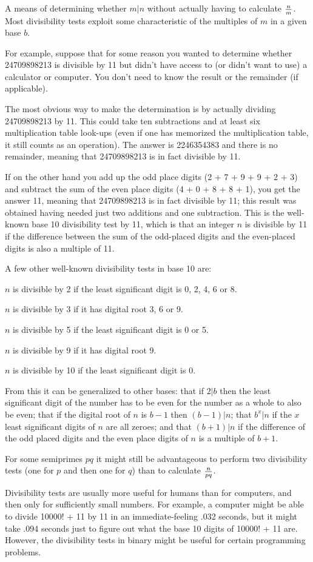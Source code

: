 \documentclass[12pt]{article}
\begin{document}
A means of determining whether $m|n$ without actually having to calculate $n \over m$. Most divisibility tests exploit some characteristic of the multiples of $m$ in a given base $b$.

For example, suppose that for some reason you wanted to determine whether 24709898213 is divisible by 11 but didn't have access to (or didn't want to use) a calculator or computer. You don't need to know the result or the remainder (if applicable).

The most obvious way to make the determination is by actually dividing 24709898213 by 11. This could take ten subtractions and at least six multiplication table look-ups (even if one has memorized the multiplication table, it still counts as an operation). The answer is 2246354383 and there is no remainder, meaning that 24709898213 is in fact divisible by 11.

If on the other hand you add up the odd place digits (2 + 7 + 9 + 9 + 2 + 3) and subtract the sum of the even place digits (4 + 0 + 8 + 8 + 1), you get the answer 11, meaning that 24709898213 is in fact divisible by 11; this result was obtained having needed just two additions and one subtraction. This is the well-known base 10 divisibility test by 11, which is that an integer $n$ is divisible by 11 if the difference between the sum of the odd-placed digits and the even-placed digits is also a multiple of 11.

A few other well-known divisibility tests in base 10 are:

$n$ is divisible by 2 if the least significant digit is 0, 2, 4, 6 or 8.

$n$ is divisible by 3 if it has digital root 3, 6 or 9.

$n$ is divisible by 5 if the least significant digit is 0 or 5.

$n$ is divisible by 9 if it has digital root 9.

$n$ is divisible by 10 if the least significant digit is 0.

From this it can be generalized to other bases: that if $2|b$ then the least significant digit of the number has to be even for the number as a whole to also be even; that if the digital root of $n$ is $b - 1$ then $(b - 1)|n$; that $b^x|n$ if the $x$ least significant digits of $n$ are all zeroes; and that $(b + 1)|n$ if the difference of the odd placed digits and the even place digits of $n$ is a multiple of $b + 1$.

For some semiprimes $pq$ it might still be advantageous to perform two divisibility tests (one for $p$ and then one for $q$) than to calculate $n \over {pq}$.

Divisibility tests are usually more useful for humans than for computers, and then only for sufficiently small numbers. For example, a computer might be able to divide 10000! + 11 by 11 in an immediate-feeling .032 seconds, but it might take .094 seconds just to figure out what the base 10 digits of 10000! + 11 are. However, the divisibility tests in binary might be useful for certain programming problems.
\end{document}
